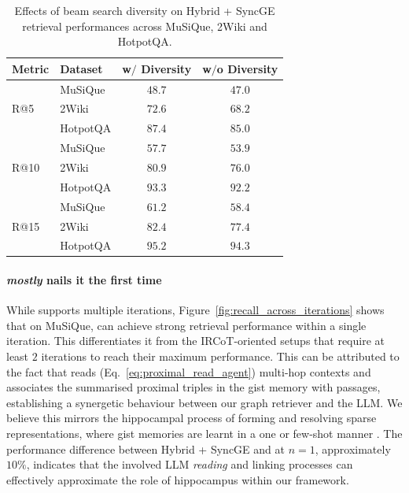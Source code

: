 \begin{table}[t]
\small
\centering
\begin{tabular}{l l cc}
\toprule
\textbf{Metric} & \textbf{Dataset} & \textbf{w}$\mathbf{/}$ \textbf{Diversity} & \textbf{w}$\mathbf{/}$\textbf{o Diversity} \\ 
\midrule
\multirow{3}{*}{R@5} & MuSiQue & $\mathbf{48.7}$ & $47.0$ \\
& 2Wiki & $\mathbf{72.6}$ & $68.2$ \\
& HotpotQA & $\mathbf{87.4}$ & $85.0$ \\
\midrule
\multirow{3}{*}{R@10} & MuSiQue & $\mathbf{57.7}$ & $53.9$ \\
& 2Wiki & $\mathbf{80.9}$ & $76.0$ \\
& HotpotQA & $\mathbf{93.3}$ & $92.2$ \\
\midrule
\multirow{3}{*}{R@15} & MuSiQue & $\mathbf{61.2}$ & $58.4$ \\
& 2Wiki & $\mathbf{82.4}$ & $77.4$ \\
& HotpotQA & $\mathbf{95.2}$ & $94.3$ \\
\bottomrule
\end{tabular}
\caption{Effects of beam search diversity on Hybrid + SyncGE retrieval performances across MuSiQue, 2Wiki and HotpotQA.}
\label{tab:diverse_beam_search}
\end{table}

\paragraph{\gear \textrm{\textit{mostly}} nails it the first time}

While \gear supports multiple iterations, Figure~\ref{fig:recall_across_iterations} shows that on MuSiQue, \gear can achieve strong retrieval performance within a single iteration. This differentiates it from the IRCoT-oriented setups that require at least $2$ iterations to reach their maximum performance. This can be attributed to the fact that \gear reads (Eq.~\ref{eq:proximal_read_agent}) multi-hop contexts and associates the summarised proximal triples in the gist memory with passages, establishing a synergetic behaviour between our graph retriever and the LLM. We believe this mirrors the hippocampal process of forming and resolving sparse representations, where gist memories are learnt in a one or few-shot manner \cite{Hanslmayr2016}. The performance difference between Hybrid + SyncGE and \gear at $n=1$, approximately $10\%$, indicates that the involved LLM \textit{reading} and linking processes can effectively approximate the role of hippocampus within our framework.




